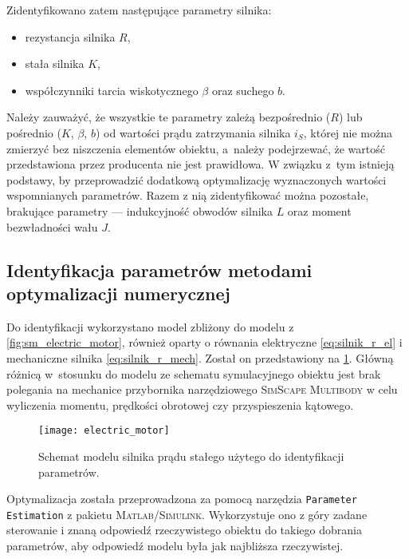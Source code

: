 Zidentyfikowano zatem następujące parametry silnika:
\begin{itemize}
    \item rezystancja silnika $R$,
    \item stała silnika $K$,
    \item współczynniki tarcia wiskotycznego $\beta$ oraz suchego $b$.
\end{itemize}

Należy zauważyć, że wszystkie te parametry zależą bezpośrednio ($R$) lub pośrednio ($K$, $\beta$, $b$) od wartości prądu zatrzymania silnika $i_S$, której nie można zmierzyć bez niszczenia elementów obiektu, a~należy podejrzewać, że wartość przedstawiona przez producenta nie jest prawidłowa. W związku z~tym istnieją podstawy, by przeprowadzić dodatkową optymalizację wyznaczonych wartości wspomnianych parametrów. Razem z nią zidentyfikować można pozostałe, brakujące parametry --- indukcyjność obwodów silnika $L$ oraz moment bezwładności wału $J$.

\subsection{Identyfikacja parametrów metodami optymalizacji numerycznej}
\label{subsec:ch5_identyfikacja_parametrow_metodami_optymalizacji_numerycznej}

Do identyfikacji wykorzystano model zbliżony do modelu z \cref{fig:sm_electric_motor}, również oparty o równania elektryczne \eqref{eq:silnik_r_el} i mechaniczne silnika \eqref{eq:silnik_r_mech}. Został on przedstawiony na \cref{fig:electric_motor}. Główną różnicą w~stosunku do modelu ze schematu symulacyjnego obiektu jest brak polegania na mechanice przybornika narzędziowego \textsc{SimScape Multibody} w celu wyliczenia momentu, prędkości obrotowej czy przyspieszenia kątowego.

\begin{figure}[h]
    \centering
    \texttt{[image: electric\_motor]}
    \caption{Schemat modelu silnika prądu stałego użytego do identyfikacji parametrów.}
    \label{fig:electric_motor}
\end{figure}

Optymalizacja została przeprowadzona za pomocą narzędzia \texttt{Parameter Estimation} z pakietu \textsc{Matlab/Simulink}. Wykorzystuje ono z góry zadane sterowanie i znaną odpowiedź rzeczywistego obiektu do takiego dobrania parametrów, aby odpowiedź modelu była jak najbliższa rzeczywistej.

